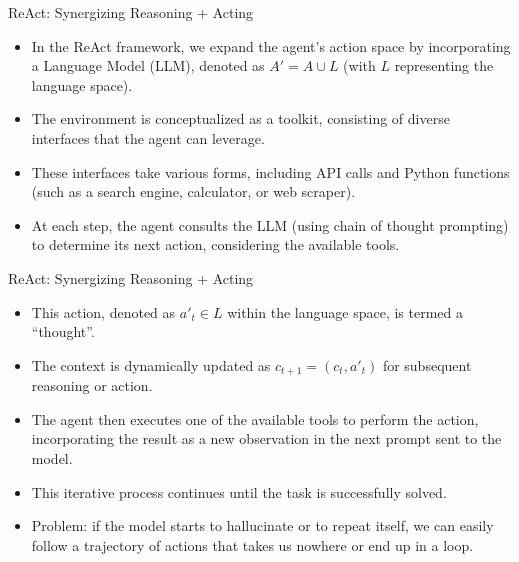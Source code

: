 \documentclass[handout]{beamer}
\begin{document}
\begin{frame}{ReAct: Synergizing Reasoning + Acting}
\scriptsize
    \begin{itemize}
\item In the ReAct framework, we expand the agent's action space by incorporating a Language Model (LLM), denoted as $A' = A \cup L$ (with $L$ representing the language space).

\item The environment is conceptualized as a toolkit, consisting of diverse interfaces that the agent can leverage.

 \item These interfaces take various forms, including API calls and Python functions (such as a search engine, calculator, or web scraper).

 \item At each step, the agent consults the LLM (using chain of thought prompting) to determine its next action, considering the available tools. 

 
    \end{itemize}
\end{frame}



\begin{frame}{ReAct: Synergizing Reasoning + Acting}
\scriptsize
    \begin{itemize}

\item This action, denoted as $a'_t \in L$ within the language space, is termed a ``thought''.

\item The context is dynamically updated as $c_{t+1} = (c_t, a'_t)$ for subsequent reasoning or action.

\item The agent then executes one of the available tools to perform the action, incorporating the result as a new observation in the next prompt sent to the model.

\item This iterative process continues until the task is successfully solved.     

\item Problem: if the model starts to hallucinate or to repeat itself, we can easily follow a trajectory of actions that takes us nowhere or end up in a loop.
    \end{itemize}
\end{frame}
\end{document}
